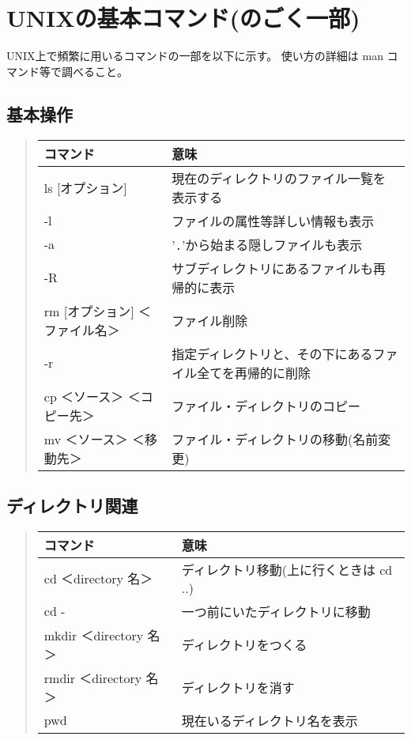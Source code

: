 \documentclass{jreport}
\begin{document}
\section{UNIXの基本コマンド(のごく一部)}

UNIX上で頻繁に用いるコマンドの一部を以下に示す。
使い方の詳細は man コマンド等で調べること。

\subsection{基本操作}

\begin{quote}
\begin{tabular}[t]{ll}\hline
コマンド & 意味 \\ \hline
ls [オプション]& 現在のディレクトリのファイル一覧を表示する \\
\qquad -l & ファイルの属性等詳しい情報も表示\\
\qquad -a & '\verb|.|'から始まる隠しファイルも表示\\
\qquad -R & サブディレクトリにあるファイルも再帰的に表示\\
rm [オプション] ＜ファイル名＞ & ファイル削除 \\
\qquad -r & 指定ディレクトリと、その下にあるファイル全てを再帰的に削除\\
\small{cp ＜ソース＞ ＜コピー先＞} &
ファイル・ディレクトリのコピー\\
\small{mv ＜ソース＞ ＜移動先＞} &
ファイル・ディレクトリの移動(名前変更)\\
\hline
\end{tabular}
\end{quote}


\subsection{ディレクトリ関連}

\begin{quote}
\begin{tabular}[t]{ll}\hline
コマンド & 意味 \\ \hline
cd ＜directory 名＞ & ディレクトリ移動(上に行くときは cd ..) \\
cd - & 一つ前にいたディレクトリに移動 \\
mkdir ＜directory 名＞ & ディレクトリをつくる \\
rmdir ＜directory 名＞ & ディレクトリを消す \\
pwd & 現在いるディレクトリ名を表示\\
\hline
\end{tabular}
\end{quote}
\end{document}
